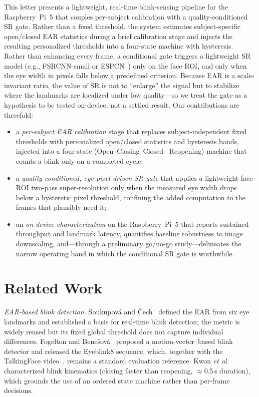 \documentclass{IEEE_lsens}
\begin{document}
This letter presents a lightweight, real-time blink-sensing pipeline for the
Raspberry~Pi~5 that couples per-subject calibration with a quality-conditioned
SR gate. Rather than a fixed threshold, the system estimates subject-specific
open/closed EAR statistics during a brief calibration stage and injects the
resulting personalized thresholds into a four-state machine with hysteresis.
Rather than enhancing every frame, a conditional gate triggers a lightweight SR
model (e.g., FSRCNN-small or ESPCN~\cite{dong2016,shi2016}) only on the
face ROI, and only when the eye width in pixels falls below a predefined
criterion. Because EAR is a scale-invariant ratio, the value of SR is not to
``enlarge'' the signal but to stabilize where the landmarks are localized under
low quality---so we treat the gate as a hypothesis to be tested on-device, not a
settled result. Our contributions are threefold:
\begin{itemize}
\item a \emph{per-subject EAR calibration} stage that replaces
subject-independent fixed thresholds with personalized open/closed statistics
and hysteresis bands, injected into a four-state (Open--Closing--Closed--%
Reopening) machine that counts a blink only on a completed cycle;
\item a \emph{quality-conditioned, eye-pixel-driven SR gate} that applies a
lightweight face-ROI two-pass super-resolution only when the measured eye width
drops below a hysteretic pixel threshold, confining the added computation to the
frames that plausibly need it;
\item an \emph{on-device characterization} on the Raspberry~Pi~5 that reports
sustained throughput and landmark latency, quantifies baseline robustness to
image downscaling, and---through a preliminary go/no-go study---delineates the
narrow operating band in which the conditional SR gate is worthwhile.
\end{itemize}

\section{Related Work}
\emph{EAR-based blink detection.} Soukupov\'a and \v{C}ech~\cite{soukupova2016}
defined the EAR from six eye landmarks and established a basis for real-time
blink detection; the metric is widely reused but its fixed global threshold does
not capture individual differences. Fogelton and Bene\v{s}ov\'a~\cite{fogelton2016}
proposed a motion-vector--based blink detector and released the Eyeblink8
sequence, which, together with the TalkingFace video~\cite{talkingface}, remains
a standard evaluation reference. Kwon \textit{et al.}~\cite{kwon2013} characterized blink kinematics
(closing faster than reopening, $\approx$0.5\,s duration), which grounds the use
of an ordered state machine rather than per-frame decisions.
\end{document}
